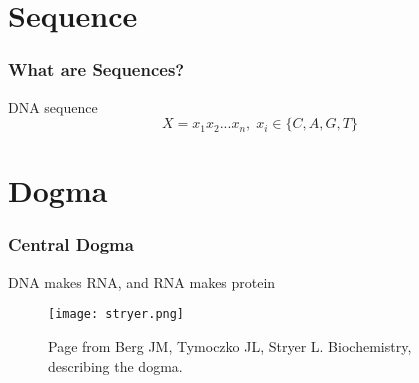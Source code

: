 \documentclass{beamer}
\begin{document}
\section{Sequence}
\begin{frame}[fragile]
\frametitle{What are Sequences?}

\begin{exampleblock}{DNA sequence}
$$X  = x_1 x_2...x_n, \; x_i \in \{ C,A,G,T \} $$
\end{exampleblock}

\end{frame}

\section{Dogma}
\begin{frame}[fragile]
\frametitle{Central Dogma}
\begin{exampleblock}{}
DNA makes RNA, and RNA makes protein
\end{exampleblock}

\begin{figure}
\centering
\texttt{[image: stryer.png]}
\caption[scale=0.4]{Page from Berg JM, Tymoczko JL, Stryer L. Biochemistry, describing the dogma.}

\end{figure}
\end{frame}
\end{document}
